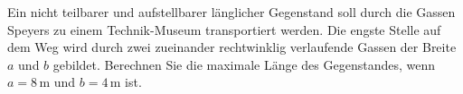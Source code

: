 \begin{ExerciseBlock}
Ein nicht teilbarer und aufstellbarer länglicher Gegenstand soll durch die Gassen Speyers zu einem Technik-Museum transportiert werden. Die engste Stelle auf dem Weg wird durch zwei zueinander rechtwinklig verlaufende Gassen der Breite $a$ und $b$ gebildet. Berechnen Sie die maximale Länge des Gegenstandes, wenn $a=8\,$m und $b=4\,$m ist.\par
\begin{center}
\end{center}

\end{ExerciseBlock}
